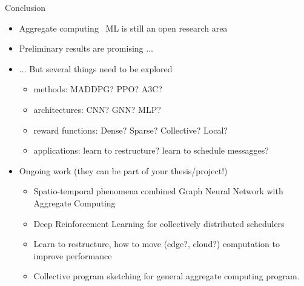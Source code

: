 \documentclass[presentation, 8pt]{beamer}\mode<presentation>{\usetheme{AMSBolognaFC}}
\begin{document}
\begin{frame}{Conclusion}
\begin{itemize}
	\item Aggregate computing \faPlus \, ML is still an open research area
	\item Preliminary results are promising ...
	\item ... But several things need to be explored
	\begin{itemize}
		\item methods: MADDPG? PPO? A3C?
		\item architectures: CNN? GNN? MLP?
		\item reward functions: Dense? Sparse? Collective? Local?
		\item applications: learn to restructure? learn to schedule messagges?
	\end{itemize}
	\item Ongoing work (they can be part of your thesis/project!)
	\begin{itemize}
		\item Spatio-temporal phenomena combined Graph Neural Network with Aggregate Computing
		\item Deep Reinforcement Learning for collectively distributed schedulers
		\item Learn to restructure, how to move (edge?, cloud?) computation to improve performance
		\item Collective program sketching for general aggregate computing program.
	\end{itemize}
\end{itemize}
\end{frame}
\section*{}

\frame{\titlepage}

\section*{\refname}

\end{document}

